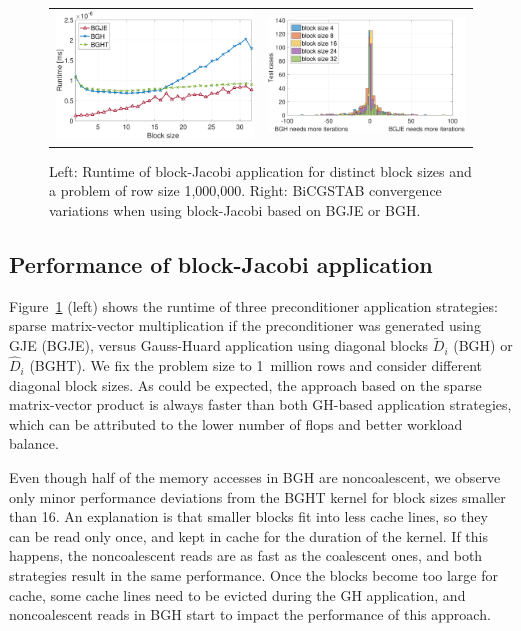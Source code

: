 \begin{figure}
\begin{center}
\begin{tabular}{ll}
\includegraphics[width=.45\columnwidth]{plots/app_dgebjp_setup_P100_spmv_gh_ght_apply_fixed.pdf}
&
\includegraphics[width=.49\columnwidth]{plots/iteration_distribution}\\
\end{tabular}
\end{center}
\caption{
Left: Runtime of block-Jacobi application for distinct block sizes and a problem of row size 1,000,000.
Right: BiCGSTAB convergence variations when using block-Jacobi based on 
BGJE or BGH.
}
\label{2017-gh-block-jacobi:fig:app_performance}
\end{figure}



\subsection{Performance of block-Jacobi application}
Figure~\ref{2017-gh-block-jacobi:fig:app_performance} (left) shows the runtime
of three preconditioner application strategies:
sparse matrix-vector multiplication if the preconditioner was generated using GJE (BGJE),
versus Gauss-Huard application using diagonal blocks $\widetilde{D}_i$ (BGH)
or $\hat{D}_i$ (BGHT).
We fix the problem size to 1~million rows and consider different diagonal block sizes.
As could be expected, the approach based on the sparse matrix-vector product 
is always faster than both GH-based application strategies,
which can be attributed to the lower number of flops
and better workload balance.

Even though half of the memory accesses in BGH are noncoalescent,
we observe only minor performance deviations from the BGHT kernel for block sizes smaller than 16.
An explanation is that smaller blocks fit into less cache lines,
so they can be read only once,
and kept in cache for the duration of the kernel.
If this happens, the noncoalescent reads are as fast as the coalescent ones,
and both strategies result in the same performance.
Once the blocks become too large for cache, some cache lines need to be evicted
during the GH application, and noncoalescent reads in BGH start to impact the performance
of this approach.

